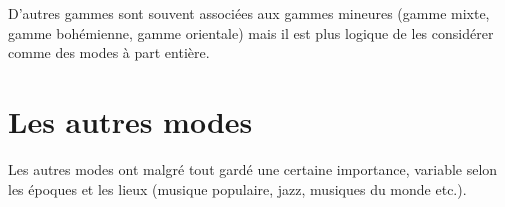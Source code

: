 \documentclass[11pt]{scrreprt}
\begin{document}
%
%
%

D'autres gammes sont souvent associées aux gammes mineures (gamme mixte, gamme bohémienne, gamme  orientale) mais il est plus logique de les considérer comme des modes à part entière.%

\section{Les autres modes}
Les autres modes ont malgré tout gardé une certaine importance, variable selon les époques et les lieux (musique populaire, jazz, musiques du monde etc.).
\end{document}
